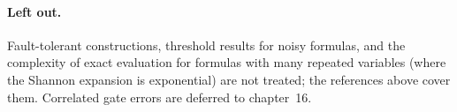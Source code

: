 \paragraph{Left out.}
Fault-tolerant constructions, threshold results for noisy formulas, and the
complexity of exact evaluation for formulas with many repeated variables (where
the Shannon expansion is exponential) are not treated; the references above
cover them. Correlated gate errors are deferred to chapter~16.
